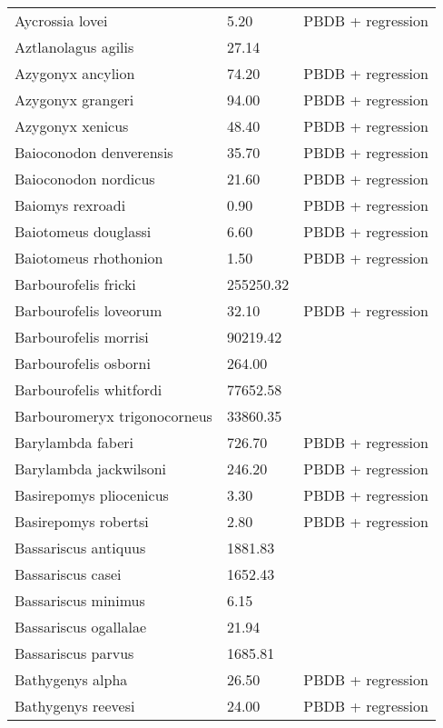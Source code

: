\documentclass{article}
\begin{document}
\begin{center}
\begin{longtable}{p{} p{} p{}}
    Aycrossia lovei & 5.20 & PBDB + regression \\ 
    Aztlanolagus agilis & 27.14 & \cite{Smith2004} \\ 
    Azygonyx ancylion & 74.20 & PBDB + regression \\ 
    Azygonyx grangeri & 94.00 & PBDB + regression \\ 
    Azygonyx xenicus & 48.40 & PBDB + regression \\ 
    Baioconodon denverensis & 35.70 & PBDB + regression \\ 
    Baioconodon nordicus & 21.60 & PBDB + regression \\ 
    Baiomys rexroadi & 0.90 & PBDB + regression \\ 
    Baiotomeus douglassi & 6.60 & PBDB + regression \\ 
    Baiotomeus rhothonion & 1.50 & PBDB + regression \\ 
    Barbourofelis fricki & 255250.32 & \cite{Tomiya2013} \\ 
    Barbourofelis loveorum & 32.10 & PBDB + regression \\ 
    Barbourofelis morrisi & 90219.42 & \cite{Tomiya2013} \\ 
    Barbourofelis osborni & 264.00 & \cite{Martin2002a} \\ 
    Barbourofelis whitfordi & 77652.58 & \cite{Tomiya2013} \\ 
    Barbouromeryx trigonocorneus & 33860.35 & \cite{Tomiya2013} \\ 
    Barylambda faberi & 726.70 & PBDB + regression \\ 
    Barylambda jackwilsoni & 246.20 & PBDB + regression \\ 
    Basirepomys pliocenicus & 3.30 & PBDB + regression \\ 
    Basirepomys robertsi & 2.80 & PBDB + regression \\ 
    Bassariscus antiquus & 1881.83 & \cite{Tomiya2013} \\ 
    Bassariscus casei & 1652.43 & \cite{Tomiya2013} \\ 
    Bassariscus minimus & 6.15 & \cite{Robinson1966} \\ 
    Bassariscus ogallalae & 21.94 & \cite{Gidley1920} \\ 
    Bassariscus parvus & 1685.81 & \cite{Tomiya2013} \\ 
    Bathygenys alpha & 26.50 & PBDB + regression \\ 
    Bathygenys reevesi & 24.00 & PBDB + regression \\ 

\end{longtable}
\end{center}
\end{document}
